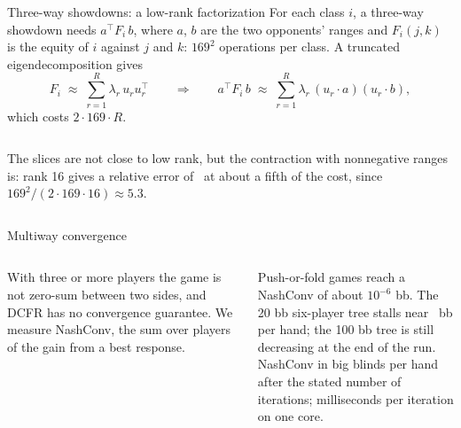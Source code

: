 \documentclass[10pt,aspectratio=169]{beamer}
\begin{document}
\begin{frame}{Three-way showdowns: a low-rank factorization}
For each class $i$, a three-way showdown needs $a^\top F_i\, b$, where $a$, $b$ are the two opponents' ranges and $F_i(j,k)$ is
the equity of $i$ against $j$ and $k$: $169^2$ operations per class. A truncated eigendecomposition gives
\[ F_i \;\approx\; \sum_{r=1}^{R} \lambda_{r}\, u_{r}u_{r}^\top
\qquad\Longrightarrow\qquad a^\top F_i\, b \;\approx\; \sum_{r=1}^{R}\lambda_r\,(u_r\cdot a)(u_r\cdot b), \]
which costs $2\cdot169\cdot R$.
\pause
\begin{columns}[T]
\centering
{\footnotesize\setlength\tabcolsep{5pt}}
\small
The slices are not close to low rank, but the contraction with nonnegative ranges is: rank 16 gives a relative error
of \LowRankErr\ at about a fifth of the cost, since $169^2/(2\cdot169\cdot16)\approx5.3$.
\end{columns}
\end{frame}

\begin{frame}{Multiway convergence}
\begin{columns}[T]
With three or more players the game is not zero-sum between two sides, and DCFR has no convergence guarantee. We measure
NashConv, the sum over players of the gain from a best response.

\pause
\medskip
Push-or-fold games reach a NashConv of about $10^{-6}$ bb. The 20 bb six-player tree stalls near \MultiTwenty\ bb per hand;
the 100 bb tree is still decreasing at the end of the run.
\centering
{\footnotesize\setlength\tabcolsep{3pt}}\\[4pt]
{\footnotesize NashConv in big blinds per hand after the stated number of iterations; milliseconds per iteration on one
core.}
\end{columns}
\end{frame}
\end{document}
